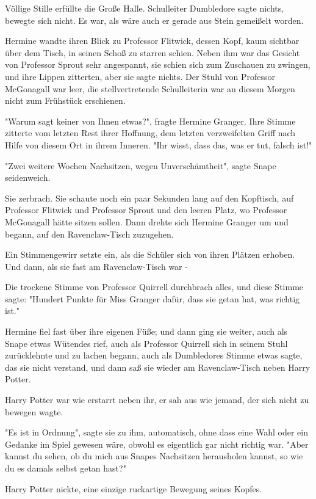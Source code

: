 {Völlige Stille erfüllte die Große Halle. Schulleiter Dumbledore sagte nichts, bewegte sich nicht. Es war, als wäre auch er gerade aus Stein gemeißelt worden.

Hermine wandte ihren Blick zu Professor Flitwick, dessen Kopf, kaum sichtbar über dem Tisch, in seinen Schoß zu starren schien. Neben ihm war das Gesicht von Professor Sprout sehr angespannt, sie schien sich zum Zuschauen zu zwingen, und ihre Lippen zitterten, aber sie sagte nichts. Der Stuhl von Professor McGonagall war leer, die stellvertretende Schulleiterin war an diesem Morgen nicht zum Frühstück erschienen.

"Warum sagt keiner von Ihnen etwas?", fragte Hermine Granger. Ihre Stimme zitterte vom letzten Rest ihrer Hoffnung, dem letzten verzweifelten Griff nach Hilfe von diesem Ort in ihrem Inneren. "Ihr wisst, dass das, was er tut, falsch ist!"

"Zwei weitere Wochen Nachsitzen, wegen Unverschämtheit", sagte Snape seidenweich.

Sie zerbrach. Sie schaute noch ein paar Sekunden lang auf den Kopftisch, auf Professor Flitwick und Professor Sprout und den leeren Platz, wo Professor McGonagall hätte sitzen sollen. Dann drehte sich Hermine Granger um und begann, auf den Ravenclaw-Tisch zuzugehen.

Ein Stimmengewirr setzte ein, als die Schüler sich von ihren Plätzen erhoben. Und dann, als sie fast am Ravenclaw-Tisch war -

Die trockene Stimme von Professor Quirrell durchbrach alles, und diese Stimme sagte: "Hundert Punkte für Miss Granger dafür, dass sie getan hat, was richtig ist."

Hermine fiel fast über ihre eigenen Füße; und dann ging sie weiter, auch als Snape etwas Wütendes rief, auch als Professor Quirrell sich in seinem Stuhl zurücklehnte und zu lachen begann, auch als Dumbledores Stimme etwas sagte, das sie nicht verstand, und dann saß sie wieder am Ravenclaw-Tisch neben Harry Potter.

Harry Potter war wie erstarrt neben ihr, er sah aus wie jemand, der sich nicht zu bewegen wagte.

"Es ist in Ordnung", sagte sie zu ihm, automatisch, ohne dass eine Wahl oder ein Gedanke im Spiel gewesen wäre, obwohl es eigentlich gar nicht richtig war. "Aber kannst du sehen, ob du mich aus Snapes Nachsitzen herausholen kannst, so wie du es damals selbst getan hast?"

Harry Potter nickte, eine einzige ruckartige Bewegung seines Kopfes.

}
